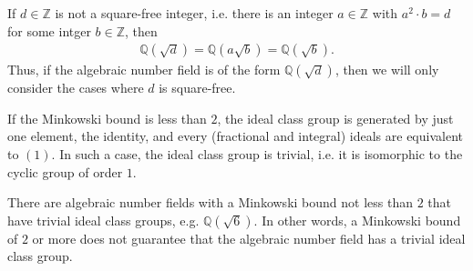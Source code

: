\begin{rembox}
    \begin{remark}
        If \(d \in \mathbb{Z}\) is not a square-free integer, i.e. there is an integer \(a \in \mathbb{Z}\) with \(a^2 \cdot b = d\) for some intger \(b \in \mathbb{Z}\), then
        \begin{align*}
            \mathbb{Q}\left(\sqrt{d}\right) = \mathbb{Q}\left(a \sqrt{b}\right) = \mathbb{Q}\left(\sqrt{b}\right) \text{.}
        \end{align*}
        Thus, if the algebraic number field is of the form \(\mathbb{Q} (\sqrt{d})\), then we will only consider the cases where \(d\) is square-free.
    \end{remark}
\end{rembox}

\begin{rembox}
    \begin{remark}
        If the Minkowski bound is less than \(2\), the ideal class group is generated by just one element, the identity, and every (fractional and integral) ideals are equivalent to \((1)\). In such a case, the ideal class group is trivial, i.e. it is isomorphic to the cyclic group of order \(1\).

        There are algebraic number fields with a Minkowski bound not less than \(2\) that have trivial ideal class groups, e.g. \(\mathbb{Q}(\sqrt{6})\). In other words, a Minkowski bound of \(2\) or more does not guarantee that the algebraic number field has a trivial ideal class group.
    \end{remark}    
\end{rembox}

